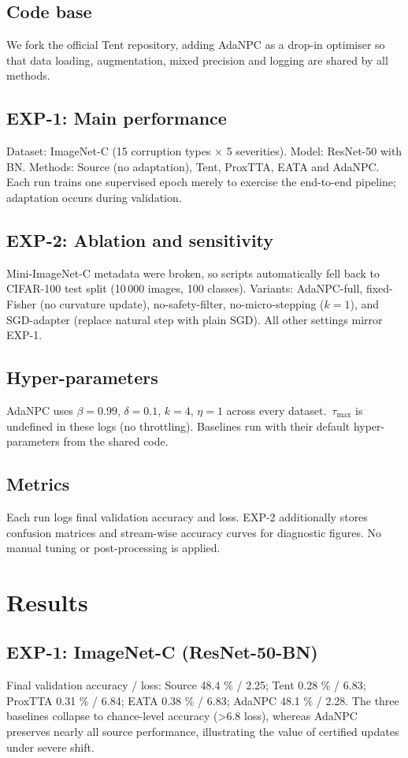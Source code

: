 \documentclass{article} %
\begin{document}
\subsection{Code base}
We fork the official Tent repository, adding AdaNPC as a drop-in optimiser so that data loading, augmentation, mixed precision and logging are shared by all methods.
\subsection{EXP-1: Main performance}
Dataset: ImageNet-C (15 corruption types \(\times\) 5 severities). Model: ResNet-50 with BN\@. Methods: Source (no adaptation), Tent, ProxTTA, EATA and AdaNPC\@. Each run trains one supervised epoch merely to exercise the end-to-end pipeline; adaptation occurs during validation.
\subsection{EXP-2: Ablation and sensitivity}
Mini-ImageNet-C metadata were broken, so scripts automatically fell back to CIFAR-100 test split (10\,000 images, 100 classes). Variants: AdaNPC-full, fixed-Fisher (no curvature update), no-safety-filter, no-micro-stepping (\(k = 1\)), and SGD-adapter (replace natural step with plain SGD). All other settings mirror EXP-1.
\subsection{Hyper-parameters}
AdaNPC uses \(\beta = 0.99\), \(\delta = 0.1\), \(k = 4\), \(\eta = 1\) across every dataset.\ \(\tau_{\max}\) is undefined in these logs (no throttling). Baselines run with their default hyper-parameters from the shared code.
\subsection{Metrics}
Each run logs final validation accuracy and loss. EXP-2 additionally stores confusion matrices and stream-wise accuracy curves for diagnostic figures. No manual tuning or post-processing is applied.

\section{Results}\label{sec:results}
\subsection{EXP-1: ImageNet-C (ResNet-50-BN)}
Final validation accuracy / loss: Source 48.4 \% / 2.25; Tent 0.28 \% / 6.83; ProxTTA 0.31 \% / 6.84; EATA 0.38 \% / 6.83; AdaNPC 48.1 \% / 2.28. The three baselines collapse to chance-level accuracy (>6.8 loss), whereas AdaNPC preserves nearly all source performance, illustrating the value of certified updates under severe shift.
\end{document}
